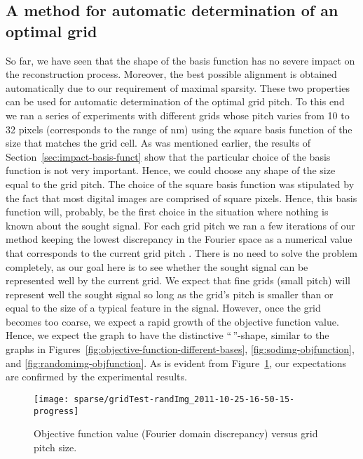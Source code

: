 \subsection{A method for automatic determination of an optimal grid}
\label{sec:meth-autom-grid}
So far, we have seen that the shape of the basis function has no
severe impact on the reconstruction process. Moreover, the best
possible alignment is obtained automatically due to our requirement of
maximal sparsity. These two properties can be used for automatic
determination of the optimal grid pitch. To this end we ran a series
of experiments with different grids whose pitch varies from 10 to 32
pixels (corresponds to the range of \unit[48--152]{nm}) using the square basis
function of the size that matches the grid cell. As was mentioned
earlier, the results of Section~\ref{sec:impact-basis-funct} show that
the particular choice of the basis function is not very
important. Hence, we could choose any shape of the size equal to the
grid pitch. The choice of the square basis function was stipulated by
the fact that most digital images are comprised of square
pixels. Hence, this basis function will, probably, be the first choice
in the situation where nothing is known about the sought signal. For
each grid pitch we ran a few iterations of our method keeping the
lowest discrepancy in the Fourier space as a numerical value that
corresponds to the current grid pitch . There is no need to solve the
problem completely, as our goal here is to see whether the sought
signal can be represented well by the current grid. We expect that
fine grids (small pitch) will represent well the sought signal so long
as the grid's pitch is smaller than or equal to the size of a typical
feature in the signal. However, once the grid becomes too coarse, we
expect a rapid growth of the objective function value. Hence, we
expect the graph to have the distinctive
``\,''-shape, similar to the graphs in
Figures~\ref{fig:objective-function-different-bases},
\ref{fig:sodimg-objfunction}, and \ref{fig:randomimg-objfunction}. As
is evident from Figure~\ref{fig:different-grids}, our expectations are
confirmed by the experimental results.
\begin{figure}[H]
  \centering
  \texttt{[image: sparse/gridTest-randImg\_2011-10-25-16-50-15-progress]}
  \caption[Objective function value versus grid pitch size]{Objective
    function value (Fourier domain discrepancy) versus grid pitch
    size.}
  \label{fig:different-grids}
\end{figure}
